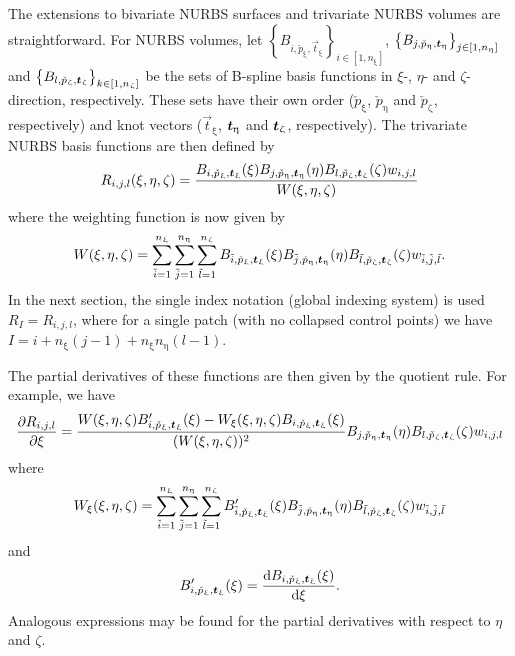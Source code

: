 \renewcommand{\Xi}{{\vec{t}_\upxi}}
The extensions to bivariate NURBS surfaces and trivariate NURBS volumes are straightforward. For NURBS volumes, let $\left\{B_{i,\check{p}_\upxi,\Xi}\right\}_{i\in[1,n_\upxi]}$, $\left\{B_{j,\check{p}_\upeta,\Eta}\right\}_{j\in[1,n_\upeta]}$ and $\left\{B_{l,\check{p}_\upzeta,\Zeta}\right\}_{k\in[1,n_\upzeta]}$ be the sets of B-spline basis functions in $\xi$-, $\eta$- and $\zeta$-direction, respectively. These sets have their own order ($\check{p}_\upxi$, $\check{p}_\upeta$ and $\check{p}_\upzeta$, respectively) and knot vectors ($\Xi$, $\Eta$ and $\Zeta$, respectively). The trivariate NURBS basis functions are then defined by
\begin{equation}\label{Eq:NURBS3D}
	R_{i,j,l}(\xi,\eta,\zeta) = \frac{B_{i,\check{p}_\upxi,\Xi}(\xi)B_{j,\check{p}_\upeta,\Eta}(\eta)B_{l,\check{p}_\upzeta,\Zeta}(\zeta)w_{i,j,l}}{W(\xi,\eta,\zeta)}
\end{equation}
where the weighting function is now given by
\begin{equation*}
	W(\xi,\eta,\zeta) = \sum_{\tilde{i}=1}^{n_\upxi}\sum_{\tilde{j}=1}^{n_\upeta}\sum_{\tilde{l}=1}^{n_\upzeta}B_{\tilde{i},\check{p}_\upxi,\Xi}(\xi)B_{\tilde{j},\check{p}_\upeta,\Eta}(\eta)B_{\tilde{l},\check{p}_\upzeta,\Zeta}(\zeta)w_{\tilde{i},\tilde{j},\tilde{l}}.
\end{equation*}
In the next section, the single index notation (global indexing system) is used $R_I = R_{i,j,l}$, where for a single patch (with no collapsed control points) we have $I=i+n_\upxi(j-1)+n_\upxi n_\upeta(l-1)$.

The partial derivatives of these functions are then given by the quotient rule. For example, we have
\begin{equation}\label{Eq:NURBS3Dders}
	\frac{\partial R_{i,j,l}}{\partial \xi} = \frac{W(\xi,\eta,\zeta)B_{i,\check{p}_\upxi,\Xi}'(\xi) - W_\xi(\xi,\eta,\zeta)B_{i,\check{p}_\upxi,\Xi}(\xi)}{(W(\xi,\eta,\zeta))^2}B_{j,\check{p}_\upeta,\Eta}(\eta)B_{l,\check{p}_\upzeta,\Zeta}(\zeta)w_{i,j,l}
\end{equation}
where
\begin{equation*}
	W_\xi(\xi,\eta,\zeta) = \sum_{\tilde{i}=1}^{n_\upxi}\sum_{\tilde{j}=1}^{n_\upeta}\sum_{\tilde{l}=1}^{n_\upzeta}B_{\tilde{i},\check{p}_\upxi,\Xi}'(\xi)B_{\tilde{j},\check{p}_\upeta,\Eta}(\eta)B_{\tilde{l},\check{p}_\upzeta,\Zeta}(\zeta)w_{\tilde{i},\tilde{j},\tilde{l}}
\end{equation*}
and
\begin{equation*}
	B_{i,\check{p}_\upxi,\Xi}'(\xi) = \frac{\diff B_{i,\check{p}_\upxi,\Xi}(\xi)}{\diff\xi}.
\end{equation*}
Analogous expressions may be found for the partial derivatives with respect to $\eta$ and $\zeta$.

